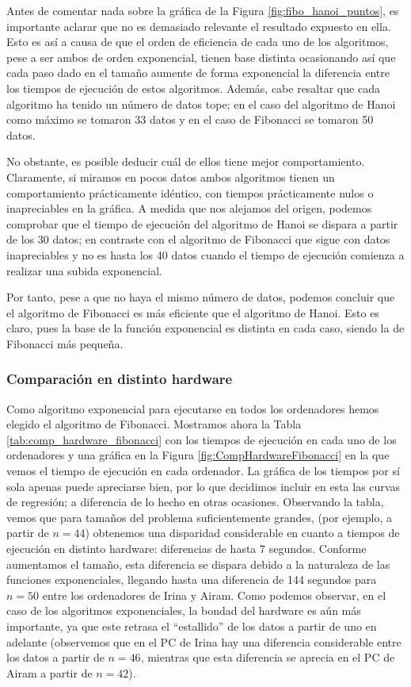 \documentclass[12pt]{article}
\begin{document}
    Antes de comentar nada sobre la gráfica de la Figura \ref{fig:fibo_hanoi_puntos}, es importante aclarar que no es demasiado relevante el resultado expuesto en ella. Esto es así a causa de que el orden de eficiencia de cada uno de los algoritmos, pese a ser ambos de orden exponencial, tienen base distinta ocasionando así que cada paso dado en el tamaño aumente de forma exponencial la diferencia entre los tiempos de ejecución de estos algoritmos.  Además, cabe resaltar que cada algoritmo ha tenido un número de datos tope; en el caso del algoritmo de Hanoi como máximo se tomaron 33 datos y en el caso de Fibonacci se tomaron 50 datos.

    No obstante, es posible deducir cuál de ellos tiene mejor comportamiento. Claramente, si miramos en pocos datos ambos algoritmos tienen un comportamiento prácticamente idéntico, con tiempos prácticamente nulos o inapreciables en la gráfica. A medida que nos alejamos del origen, podemos comprobar que el tiempo de ejecución del algoritmo de Hanoi se dispara a partir de los 30 datos; en contraste con el algoritmo de Fibonacci que sigue con datos inapreciables y no es hasta los 40 datos cuando el tiempo de ejecución comienza a realizar una subida exponencial. 

    Por tanto, pese a que no haya el mismo número de datos, podemos concluir que el algoritmo de Fibonacci es más eficiente que el algoritmo de Hanoi. Esto es claro, pues la base de la función exponencial es distinta en cada caso, siendo la de Fibonacci más pequeña.
    
    
    \subsubsection{Comparación en distinto hardware}
    Como algoritmo exponencial para ejecutarse en todos los ordenadores hemos elegido el algoritmo de Fibonacci. Mostramos ahora la Tabla \ref{tab:comp_hardware_fibonacci} con los tiempos de ejecución en cada uno de los ordenadores y una gráfica en la Figura \ref{fig:CompHardwareFibonacci} en la que vemos el tiempo de ejecución en cada ordenador. La gráfica de los tiempos por sí sola apenas puede apreciarse bien, por lo que decidimos incluir en esta las curvas de regresión; a diferencia de lo hecho en otras ocasiones. Observando la tabla, vemos que para tamaños del problema suficientemente grandes, (por ejemplo, a partir de $n = 44$) obtenemos una disparidad considerable en cuanto a tiempos de ejecución en distinto hardware: diferencias de hasta 7 segundos. Conforme aumentamos el tamaño, esta diferencia se dispara debido a la naturaleza de las funciones exponenciales, llegando hasta una diferencia de 144 segundos para $n=50$ entre los ordenadores de Irina y Airam. Como podemos observar, en el caso de los algoritmos exponenciales, la bondad del hardware es aún más importante, ya que este retrasa el ``estallido'' de los datos a partir de uno en adelante (observemos que en el PC de Irina hay una diferencia considerable entre los datos a partir de $n=46$, mientras que esta diferencia se aprecia en el PC de Airam a partir de $n=42$).
    
\end{document}
